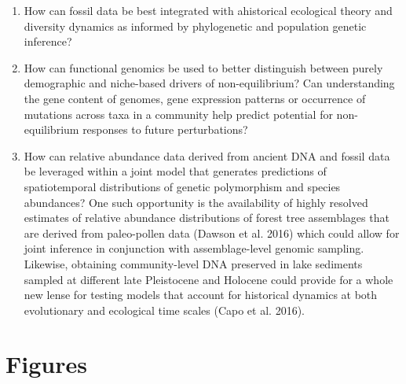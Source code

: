 \documentclass[12pt]{article}
\begin{document}
\begin{enumerate}
\item How can fossil data be best integrated with ahistorical
  ecological theory and diversity dynamics as informed by phylogenetic
  and population genetic inference?
\item How can functional genomics be used to better distinguish
  between purely demographic and niche-based drivers of
  non-equilibrium? Can understanding the gene content of genomes, gene expression patterns or occurrence of mutations
across taxa in a community help predict potential for
  non-equilibrium responses to future perturbations? 
\item How can relative abundance data derived from ancient DNA and fossil data be leveraged within a joint model that generates predictions of spatiotemporal distributions of genetic polymorphism and species abundances? One such opportunity is the availability of highly resolved estimates of relative abundance distributions of forest tree assemblages that are derived from paleo-pollen data (Dawson et al. 2016) which could allow for joint inference in conjunction with assemblage-level genomic sampling. Likewise, obtaining community-level DNA preserved in lake sediments sampled at different late Pleistocene and Holocene could provide for a whole new lense for testing models that account for historical dynamics at both evolutionary and ecological time scales (Capo et al. 2016). 
% 
% 
\end{enumerate}

\pagebreak

\section*{Figures}
\end{document}
